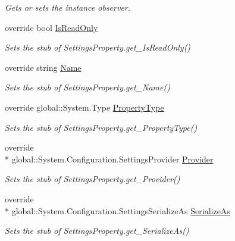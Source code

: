\begin{DoxyCompactItemize}
\begin{DoxyCompactList}\small\item\em Gets or sets the instance observer.\end{DoxyCompactList}\item 
override bool \hyperlink{class_system_1_1_configuration_1_1_fakes_1_1_stub_settings_property_a95fdf2722728c350f8582b316c0b0161}{Is\-Read\-Only}
\begin{DoxyCompactList}\small\item\em Sets the stub of Settings\-Property.\-get\-\_\-\-Is\-Read\-Only()\end{DoxyCompactList}\item 
override string \hyperlink{class_system_1_1_configuration_1_1_fakes_1_1_stub_settings_property_a31dcb26e3a77e3537f321e53690045b1}{Name}
\begin{DoxyCompactList}\small\item\em Sets the stub of Settings\-Property.\-get\-\_\-\-Name()\end{DoxyCompactList}\item 
override global\-::\-System.\-Type \hyperlink{class_system_1_1_configuration_1_1_fakes_1_1_stub_settings_property_a2dcf6ac75e302d26af20ab3c70441a97}{Property\-Type}
\begin{DoxyCompactList}\small\item\em Sets the stub of Settings\-Property.\-get\-\_\-\-Property\-Type()\end{DoxyCompactList}\item 
override \\*
global\-::\-System.\-Configuration.\-Settings\-Provider \hyperlink{class_system_1_1_configuration_1_1_fakes_1_1_stub_settings_property_ae0e9b081c1d641c684b713777a8d3970}{Provider}
\begin{DoxyCompactList}\small\item\em Sets the stub of Settings\-Property.\-get\-\_\-\-Provider()\end{DoxyCompactList}\item 
override \\*
global\-::\-System.\-Configuration.\-Settings\-Serialize\-As \hyperlink{class_system_1_1_configuration_1_1_fakes_1_1_stub_settings_property_a0ad233811003228dbbef64e61ed5fa25}{Serialize\-As}
\begin{DoxyCompactList}\small\item\em Sets the stub of Settings\-Property.\-get\-\_\-\-Serialize\-As()\end{DoxyCompactList}\end{DoxyCompactItemize}


